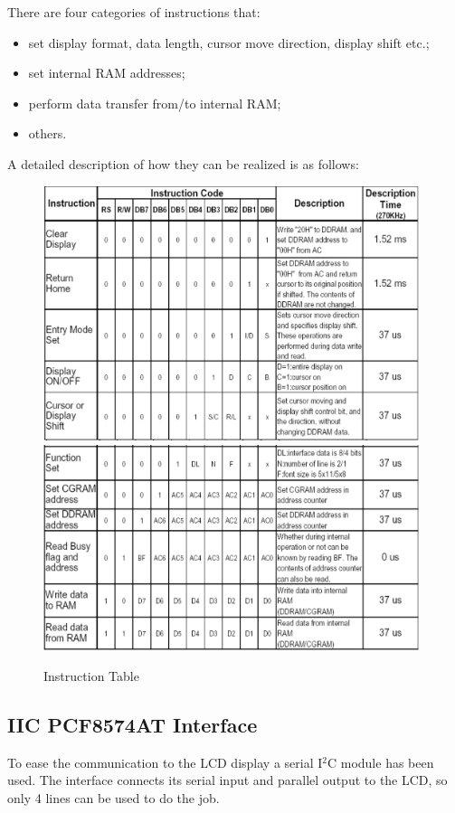 \documentclass[a4paper, 12pt]{article}
\begin{document}
There are four categories of instructions that:
\begin{itemize}
    \item set display format, data length, cursor move direction, display shift etc.;
    \item set internal RAM addresses;
    \item perform data transfer from/to internal RAM;
    \item others.
\end{itemize}
A detailed description of how they can be realized is as follows:
\begin{figure}[h]
    \includegraphics[width=11cm]{lcd_instructions_pt1}
    \includegraphics[width=11cm]{lcd_instructions_pt2}
    \centering
    \caption{Instruction Table}
\end{figure}

\subsection{IIC PCF8574AT Interface}
To ease the communication to the LCD display a serial I$^2$C module\cite{i2cLcd,PCF8574} has been used.
The interface connects its serial input and parallel output to the LCD, so only 4 lines can be used to do the job.
\end{document}
